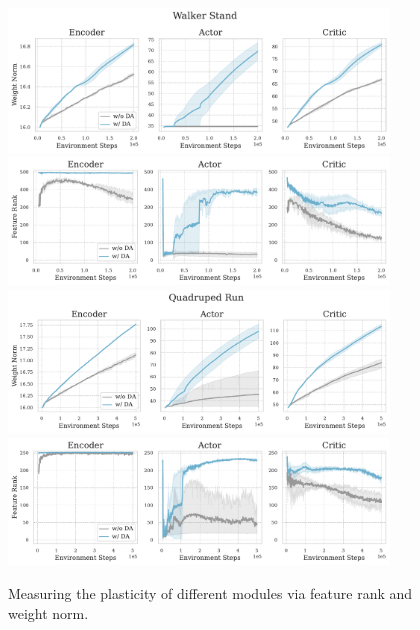 \begin{figure}[ht]
  \centering
  \includegraphics[width=0.9\textwidth]{Figures/5Appendix/WS_Weight_Norm.pdf}
  \includegraphics[width=0.9\textwidth]{Figures/5Appendix/WS_Feature_Rank.pdf}\\
  \vspace{\baselineskip} 
  \includegraphics[width=0.9\textwidth]{Figures/5Appendix/QR_Weight_Norm.pdf}
  \includegraphics[width=0.9\textwidth]{Figures/5Appendix/QR_Feature_Rank.pdf}
  \caption{Measuring the plasticity of different modules via feature rank and weight norm.}
\end{figure}

